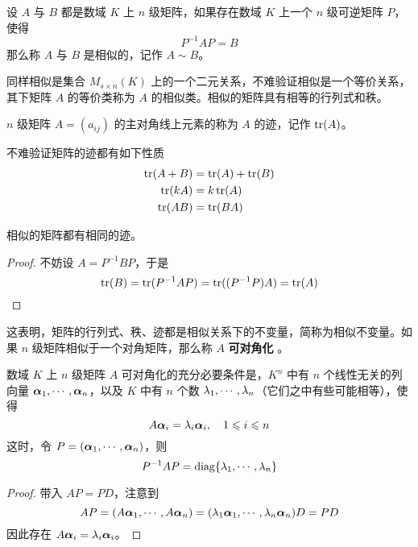 \begin{definition}[矩阵相似] 
	设 $A$ 与 $B$ 都是数域 $K$ 上 $n$ 级矩阵，如果存在数域 $K$ 上一个 $n$ 级可逆矩阵 $P$，使得
	\[ P^{-1}AP = B \]
	那么称 $A$ 与 $B$ 是相似的，记作 $A\sim B$。
\end{definition}

同样相似是集合 $M_{s\times n}(K)$ 上的一个二元关系，不难验证相似是一个等价关系，其下矩阵 $A$ 的等价类称为 $A$ 的相似类。相似的矩阵具有相等的行列式和秩。

\begin{definition}
	$n$ 级矩阵 $A=(a_{ij})$ 的主对角线上元素的称为 $A$ 的迹，记作 $\operatorname{tr}(A)$。
\end{definition}

不难验证矩阵的迹都有如下性质
\[ 
	\begin{aligned}
		\operatorname{tr}(A+B) & = \operatorname{tr}(A) + \operatorname{tr}(B) \\
		\operatorname{tr}(kA)  & = k\operatorname{tr}(A)         \\
		\operatorname{tr}(AB)  & = \operatorname{tr}(BA)
	\end{aligned}
\]

\begin{theorem}
	相似的矩阵都有相同的迹。
\end{theorem}

\begin{proof}
	不妨设 $A = P^{-1} B P$，于是
	\[ \operatorname{tr}(B) = \operatorname{tr}(P^{-1} AP) = \operatorname{tr}((P^{-1}P)A) = \operatorname{tr}(A) \]
\end{proof}

这表明，矩阵的行列式、秩、迹都是相似关系下的不变量，简称为相似不变量。如果 $n$ 级矩阵相似于一个对角矩阵，那么称 $A$ \textbf{可对角化} 。

\begin{theorem} 
	数域 $K$ 上 $n$ 级矩阵 $A$ 可对角化的充分必要条件是，$K^n$ 中有 $n$ 个线性无关的列向量 $\boldsymbol{\alpha}_1,\cdots,\boldsymbol{\alpha}_n$，以及 $K$ 中有 $n$ 个数 $\lambda_1,\cdots,\lambda_n$（它们之中有些可能相等），使得
	\[ A\boldsymbol{\alpha}_i = \lambda_i \boldsymbol{\alpha}_i, \quad  1 \leqslant i \leqslant n \]
	这时，令 $P = (\boldsymbol{\alpha}_1,\cdots,\boldsymbol{\alpha}_n)$，则
	\[ P^{-1}AP = \operatorname{diag}\{\lambda_1,\cdots,\lambda_n\} \]
\end{theorem}

\begin{proof}
	带入 $AP = PD$，注意到
	\[ AP = (A\boldsymbol{\alpha}_1,\cdots,A\boldsymbol{\alpha}_n) = (\lambda_1 \boldsymbol{\alpha}_1, \cdots, \lambda_n \boldsymbol{\alpha}_n)D = PD \]
	因此存在 $A \boldsymbol{\alpha}_i = \lambda_i \boldsymbol{\alpha}_i$。
\end{proof}

